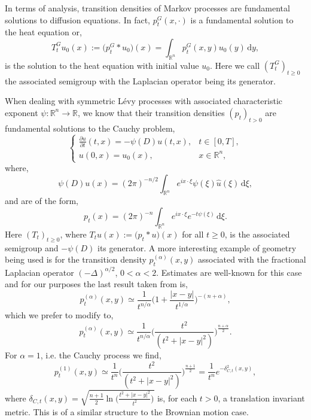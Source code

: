 \documentclass[a4paper, 12pt]{report}
\theoremstyle{remark}
\theoremstyle{definition}
\begin{document}
In terms of analysis, transition densities of Markov processes are fundamental solutions to diffusion equations.  In fact, $p_t^G(x, \cdot)$ is a fundamental solution to the heat equation or,
$$
T_t^Gu_0(x) := \big(p_t^G \ast u_0\big)(x) = \int_{\mathbb{R}^n}p_t^G(x, y)u_0(y)\,\mathrm{d}y,
$$
is the solution to the heat equation with initial value $u_0$.  Here we call $(T_t^G)_{t \ge 0}$ the associated semigroup with the Laplacian operator being its generator.

When dealing with symmetric L\'evy processes with associated characteristic exponent $\psi : \mathbb{R}^n \to \mathbb{R}$, we know that their transition densities $(p_t)_{t > 0}$ are fundamental solutions to the Cauchy problem,
$$
\begin{cases}
\frac{\partial u}{\partial t}(t, x) = -\psi(D)u(t, x), & t \in [0, T],\\
u(0, x) = u_0(x), & x \in \mathbb{R}^n,
\end{cases}
$$
where,
$$
\psi(D)u(x) = (2\pi)^{-n/2}\int_{\mathbb{R}^n}e^{ix\cdot\xi}\psi(\xi)\hat{u}(\xi)\,\mathrm{d}\xi,
$$
and are of the form,
$$
p_t(x) = (2\pi)^{-n}\int_{\mathbb{R}^n}e^{ix\cdot\xi}e^{-t\psi(\xi)}\,\mathrm{d}\xi.
$$
Here $(T_t)_{t \ge 0}$, where $T_tu(x) := \big(p_t \ast u\big)(x)$ for all $t \ge 0$, is the associated semigroup and $-\psi(D)$ its generator.  A more interesting example of geometry being used is for the transition density $p_t^{(\alpha)}(x, y)$ associated with the fractional Laplacian operator $(-\Delta)^{\alpha/2}$, $0 < \alpha < 2$.  Estimates are well-known for this case and for our purposes the last result taken from \cite{m-stableEstimate} is,
$$
p_t^{(\alpha)}(x, y) \simeq \frac{1}{t^{n/\alpha}}\bigg(1 + \frac{|x - y|}{t^{1/\alpha}}\bigg)^{-(n + \alpha)},
$$
which we prefer to modify to,
$$
p_t^{(\alpha)}(x, y) \simeq \frac{1}{t^{n/\alpha}}\bigg(\frac{t^2}{(t^2 + |x - y|^2)}\bigg)^{\frac{n + \alpha}{2}}.
$$
For $\alpha = 1$, i.e. the Cauchy process we find,
$$
p_t^{(1)}(x, y) \simeq \frac{1}{t^n}\bigg(\frac{t^2}{(t^2 + |x - y|^2)}\bigg)^{\frac{n + 1}{2}} = \frac{1}{t^n}e^{-\delta_{C, t}^2(x, y)},
$$
where $\delta_{C, t}(x, y) = \sqrt{\frac{n + 1}{2}\ln\big(\frac{t^2 + |x - y|^2}{t^2}\big)}$ is, for each $t > 0$, a translation invariant metric.  This is of a similar structure to the Brownian motion case.
\end{document}
